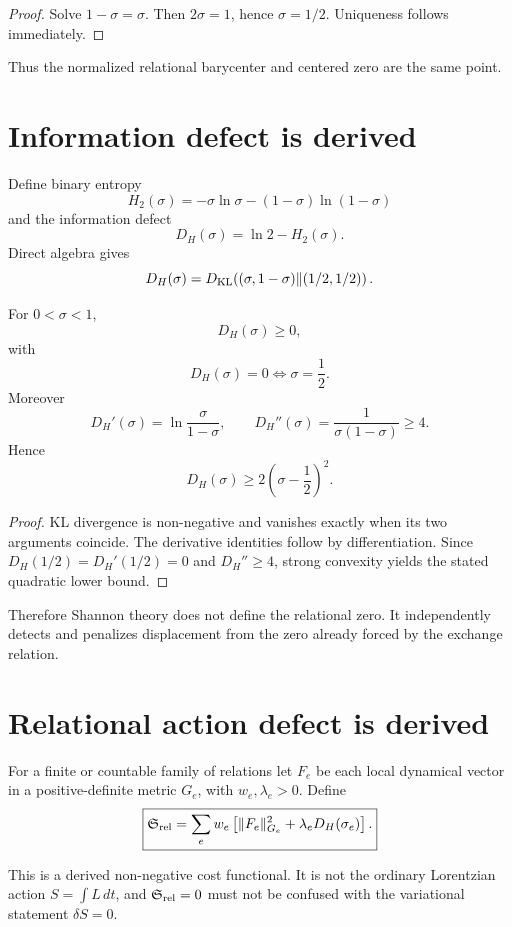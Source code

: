 \begin{proof}
Solve \(1-\sigma=\sigma\).  Then \(2\sigma=1\), hence
\(\sigma=1/2\).  Uniqueness follows immediately.
\end{proof}

Thus the normalized relational barycenter and centered zero are the same
point.

\section{Information defect is derived}

Define binary entropy
\[
H_2(\sigma)
=
-\sigma\ln\sigma-(1-\sigma)\ln(1-\sigma)
\]
and the information defect
\[
D_H(\sigma)
=
\ln2-H_2(\sigma).
\]
Direct algebra gives
\[
D_H(\sigma)
=
D_{\rm KL}\!\left(
(\sigma,1-\sigma)
\middle\|
(1/2,1/2)
\right).
\]

\begin{theorem}
\label{thm:rz-shannon}
For \(0<\sigma<1\),
\[
D_H(\sigma)\ge0,
\]
with
\[
D_H(\sigma)=0
\iff
\sigma=\frac12.
\]
Moreover
\[
D_H'(\sigma)=\ln\frac{\sigma}{1-\sigma},
\qquad
D_H''(\sigma)=\frac1{\sigma(1-\sigma)}\ge4.
\]
Hence
\[
\boxed{
D_H(\sigma)\ge2\left(\sigma-\frac12\right)^2.
}
\]
\end{theorem}

\begin{proof}
KL divergence is non-negative and vanishes exactly when its two arguments
coincide.  The derivative identities follow by differentiation.  Since
\(D_H(1/2)=D_H'(1/2)=0\) and \(D_H''\ge4\), strong convexity yields the stated
quadratic lower bound.
\end{proof}

Therefore Shannon theory does not define the relational zero.  It independently
detects and penalizes displacement from the zero already forced by the
exchange relation.

\section{Relational action defect is derived}

For a finite or countable family of relations let \(F_e\) be each local
dynamical vector in a positive-definite metric \(G_e\), with
\(w_e,\lambda_e>0\).  Define
\[
\boxed{
\mathfrak S_{\rm rel}
=
\sum_e
w_e
\left[
\|F_e\|_{G_e}^2
+
\lambda_eD_H(\sigma_e)
\right].
}
\]

This is a derived non-negative cost functional.  It is not the ordinary
Lorentzian action \(S=\int L\,dt\), and \(\mathfrak S_{\rm rel}=0\) must not
be confused with the variational statement \(\delta S=0\).

